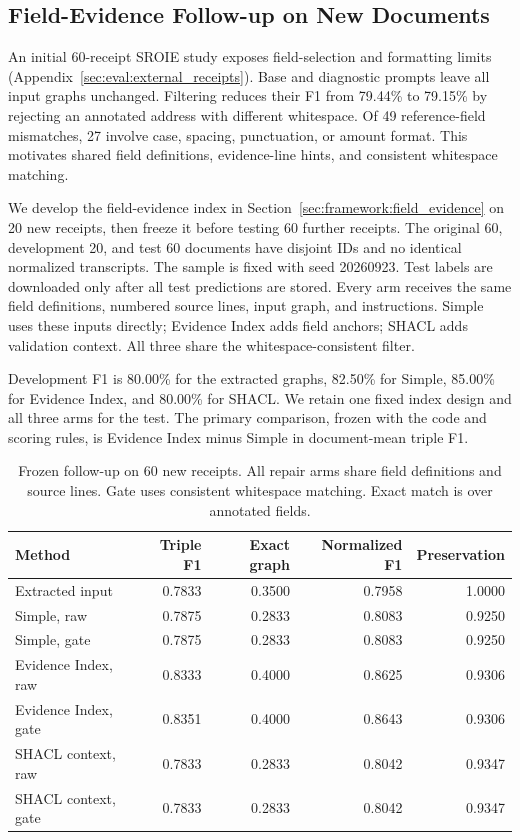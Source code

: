 \subsection{Field-Evidence Follow-up on New Documents}
\label{sec:eval:receipt_followup}

An initial 60-receipt SROIE study exposes field-selection and formatting
limits (Appendix~\ref{sec:eval:external_receipts}). Base and diagnostic prompts leave
all input graphs unchanged. Filtering reduces their F1 from 79.44\% to
79.15\% by rejecting an annotated address with different whitespace.
Of 49 reference-field mismatches, 27 involve case, spacing, punctuation, or
amount format. This motivates shared field definitions, evidence-line hints,
and consistent whitespace matching.

We develop the field-evidence index in
Section~\ref{sec:framework:field_evidence} on 20 new receipts, then freeze it
before testing 60 further receipts. The original 60, development 20, and test
60 documents have disjoint IDs and no identical normalized transcripts.
The sample is fixed with seed 20260923. Test labels are downloaded only after
all test predictions are stored. Every arm receives the same field
definitions, numbered source lines, input graph, and instructions. Simple
uses these inputs directly; Evidence Index adds field anchors; SHACL adds
validation context. All three share the whitespace-consistent filter.

Development F1 is 80.00\% for the extracted graphs,
82.50\% for Simple,
85.00\% for Evidence Index, and
80.00\% for SHACL. We retain one fixed index design
and all three arms for the test. The primary comparison, frozen with the code
and scoring rules, is Evidence Index minus Simple in document-mean triple F1.

\begin{table}[t]
\centering
\caption{Frozen follow-up on 60 new receipts. All repair arms share field
 definitions and source lines. Gate uses consistent whitespace matching.
 Exact match is over annotated fields.}
\label{tab:receipt_followup}
\small
\begin{tabular}{lrrrr}
\toprule
Method & Triple F1 & Exact graph & Normalized F1 & Preservation \\
\midrule
Extracted input & 0.7833 & 0.3500 & 0.7958 & 1.0000 \\
Simple, raw & 0.7875 & 0.2833 & 0.8083 & 0.9250 \\
Simple, gate & 0.7875 & 0.2833 & 0.8083 & 0.9250 \\
Evidence Index, raw & 0.8333 & 0.4000 & 0.8625 & 0.9306 \\
Evidence Index, gate & 0.8351 & 0.4000 & 0.8643 & 0.9306 \\
SHACL context, raw & 0.7833 & 0.2833 & 0.8042 & 0.9347 \\
SHACL context, gate & 0.7833 & 0.2833 & 0.8042 & 0.9347 \\
\bottomrule
\end{tabular}
\end{table}

